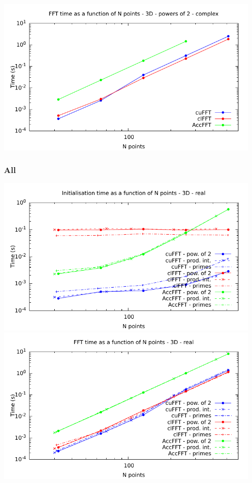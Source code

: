 \documentclass[12pt, a4paper]{article}
\begin{document}
\includegraphics[height=8cm]{graphs/fft-3d-pow2-c-exec.pdf}\\
\subsubsection{All}
\includegraphics[height=8cm]{graphs/fft-3d-r-init.pdf}\\
\includegraphics[height=8cm]{graphs/fft-3d-r-exec.pdf}\\
\end{document}
